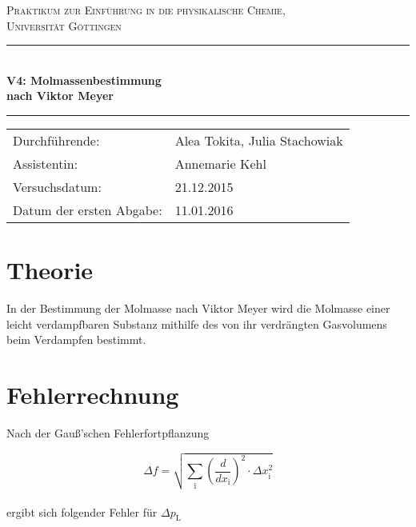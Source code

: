 \documentclass[12pt,a4paper,titlepage,headinclude,bibtotoc]{scrartcl}
\begin{document}
\begin{titlepage}
\centering
\textsc{\Large Praktikum zur Einführung in die physikalische Chemie,\\[1.5ex] Universität Göttingen}

\vspace*{2cm}

\rule{\textwidth}{1pt}\\[0.5cm]
{\huge \bfseries
  V4: Molmassenbestimmung\\[1.5ex]
  nach Viktor Meyer}\\[0.5cm]
\rule{\textwidth}{1pt}

\vspace*{1cm}


\begin{Large}
\begin{tabular}{ll}
Durchführende: &  Alea Tokita, Julia Stachowiak\\
Assistentin: & Annemarie Kehl\\
 Versuchsdatum: & 21.12.2015\\
 Datum der ersten Abgabe: & 11.01.2016
\end{tabular}
\end{Large}

\vspace*{2cm}

\begin{Large}
\end{Large}

\end{titlepage}

\tableofcontents

\newpage
\section{Theorie}
In der Bestimmung der Molmasse nach Viktor Meyer wird die Molmasse einer leicht verdampfbaren Substanz mithilfe des von ihr verdrängten Gasvolumens beim Verdampfen bestimmt.





\section{Fehlerrechnung}


Nach der Gauß'schen Fehlerfortpflanzung

\begin{equation}
\Delta f = \sqrt{\sum_\mathrm{i} \left(\frac{d}{dx_\mathrm{i}}\right)^{2} \cdot \Delta x_\mathrm{i}^2}
\end{equation}
\\

ergibt sich folgender Fehler für $\Delta p_\mathrm{L}$
\end{document}
